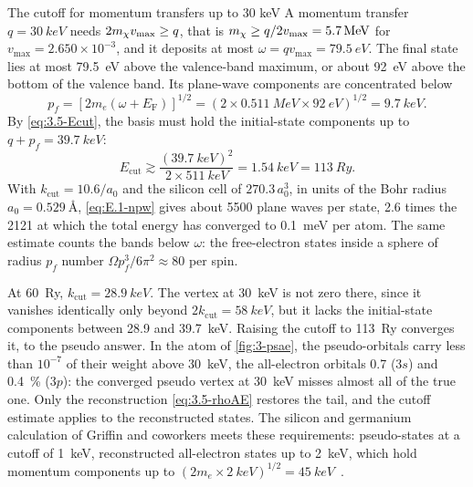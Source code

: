 \begin{workedexample}{The cutoff for momentum transfers up to 30 keV}\label{we:3-Ecut}
A momentum transfer $q = \SI{30}{keV}$ needs $2m_{\chi} v_{\mathrm{max}} \ge q$, that is $m_{\chi} \ge q/2v_{\mathrm{max}} = \SI{5.7}{MeV}$ for $v_{\mathrm{max}} = 2.650\times10^{-3}$, and it deposits at most $\omega = qv_{\mathrm{max}} = \SI{79.5}{eV}$. The final state lies at most \SI{79.5}{eV} above the valence-band maximum, or about \SI{92}{eV} above the bottom of the valence band. Its plane-wave components are concentrated below
\begin{equation*}
  p_f = [2m_e(\omega + E_{\mathrm{F}})]^{1/2} = (2\times\SI{0.511}{MeV}\times\SI{92}{eV})^{1/2} = \SI{9.7}{keV} .
\end{equation*}
By \cref{eq:3.5-Ecut}, the basis must hold the initial-state components up to $q + p_f = \SI{39.7}{keV}$:
\begin{equation*}
  E_{\mathrm{cut}} \gtrsim \frac{(\SI{39.7}{keV})^2}{2\times\SI{511}{keV}} = \SI{1.54}{keV} = \SI{113}{Ry} .
\end{equation*}
With $k_{\mathrm{cut}} = 10.6/a_0$ and the silicon cell of $270.3\,a_0^3$, in units of the Bohr radius $a_0 = \SI{0.529}{\angstrom}$, \cref{eq:E.1-npw} gives about 5500 plane waves per state, 2.6 times the 2121 at which the total energy has converged to \SI{0.1}{meV} per atom. The same estimate counts the bands below $\omega$: the free-electron states inside a sphere of radius $p_f$ number $\Omega p_f^3/6\pi^2 \approx 80$ per spin.

At \SI{60}{Ry}, $k_{\mathrm{cut}} = \SI{28.9}{keV}$. The vertex at \SI{30}{keV} is not zero there, since it vanishes identically only beyond $2k_{\mathrm{cut}} = \SI{58}{keV}$, but it lacks the initial-state components between 28.9 and \SI{39.7}{keV}. Raising the cutoff to \SI{113}{Ry} converges it, to the pseudo answer. In the atom of \cref{fig:3-psae}, the pseudo-orbitals carry less than $10^{-7}$ of their weight above \SI{30}{keV}, the all-electron orbitals 0.7 ($3s$) and \SI{0.4}{\percent} ($3p$): the converged pseudo vertex at \SI{30}{keV} misses almost all of the true one. Only the reconstruction \cref{eq:3.5-rhoAE} restores the tail, and the cutoff estimate applies to the reconstructed states. The silicon and germanium calculation of Griffin and coworkers meets these requirements: pseudo-states at a cutoff of \SI{1}{keV}, reconstructed all-electron states up to \SI{2}{keV}, which hold momentum components up to $(2m_e\times\SI{2}{keV})^{1/2} = \SI{45}{keV}$~\cite[Sect.~2.1]{griffin2021extended}.
\end{workedexample}

